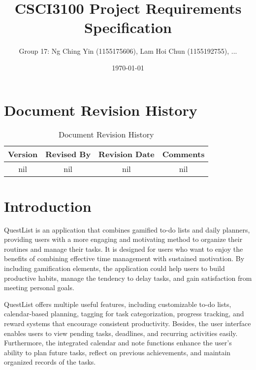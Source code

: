 \documentclass[11pt]{article}
\title{CSCI3100 Project Requirements Specification}
\author{Group 17: Ng Ching Yin (1155175606), Lam Hoi Chun (1155192755), ...}
\date{\today}
\begin{document}
\maketitle

{
    \hypersetup{linkcolor=black}
    \tableofcontents
}

\newpage

\section{Document Revision History}
\begin{table}[h]
    \centering
    \caption{Document Revision History}
    \begin{tabular}{cccc}
        \toprule
        Version & Revised By & Revision Date & Comments \\
        \midrule
        nil & nil & nil & nil \\
        \bottomrule
    \end{tabular}
    \label{tab:docs_rev_hist}
\end{table}

\section{Introduction}

QuestList is an application that combines gamified to-do lists and daily planners, providing users with a more engaging and motivating method to organize their routines and manage their tasks.  It is designed for users who want to enjoy the benefits of combining effective time management with sustained motivation. By including gamification elements, the application could help users to build productive habits, manage the tendency to delay tasks, and gain satisfaction from meeting personal goals. 

QuestList offers multiple useful features, including customizable to-do lists, calendar-based planning, tagging for task categorization, progress tracking, and reward systems that encourage consistent productivity. Besides, the user interface enables users to view pending tasks, deadlines, and recurring activities easily. Furthermore, the integrated calendar and note functions enhance the user’s ability to plan future tasks, reflect on previous achievements, and maintain organized records of the tasks.
\end{document}
